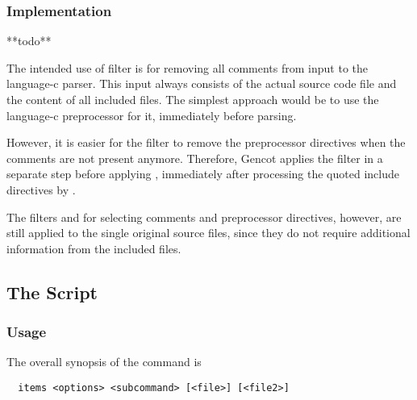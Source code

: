 \subsubsection{Implementation}

**todo**

The intended use of filter  is for removing all comments from input to the language-c parser.
This input always consists of the actual source code file and the content of all included files. The simplest approach
would be to use the language-c preprocessor for it, immediately before parsing. 

However, it is easier for the filter  to remove the preprocessor directives when the comments are 
not present anymore. Therefore, Gencot applies the filter  in a separate step before applying
, immediately after processing the quoted include directives by .
 
The filters  and  for selecting comments and preprocessor directives, however, are
still applied to the single original source files, since they do not require additional information from the included files.


\subsection{The  Script}
\label{impl-all-items}

\subsubsection{Usage}

The overall synopsis of the  command is
\begin{verbatim}
  items <options> <subcommand> [<file>] [<file2>]
\end{verbatim}

